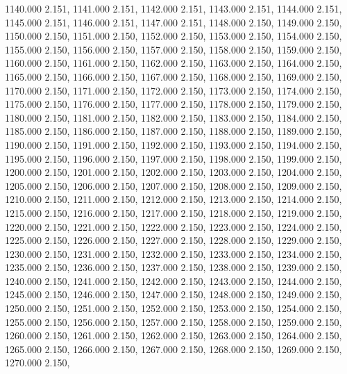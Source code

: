 1140.000 2.151, 
1141.000 2.151, 
1142.000 2.151, 
1143.000 2.151, 
1144.000 2.151, 
1145.000 2.151, 
1146.000 2.151, 
1147.000 2.151, 
1148.000 2.150, 
1149.000 2.150, 
1150.000 2.150, 
1151.000 2.150, 
1152.000 2.150, 
1153.000 2.150, 
1154.000 2.150, 
1155.000 2.150, 
1156.000 2.150, 
1157.000 2.150, 
1158.000 2.150, 
1159.000 2.150, 
1160.000 2.150, 
1161.000 2.150, 
1162.000 2.150, 
1163.000 2.150, 
1164.000 2.150, 
1165.000 2.150, 
1166.000 2.150, 
1167.000 2.150, 
1168.000 2.150, 
1169.000 2.150, 
1170.000 2.150, 
1171.000 2.150, 
1172.000 2.150, 
1173.000 2.150, 
1174.000 2.150, 
1175.000 2.150, 
1176.000 2.150, 
1177.000 2.150, 
1178.000 2.150, 
1179.000 2.150, 
1180.000 2.150, 
1181.000 2.150, 
1182.000 2.150, 
1183.000 2.150, 
1184.000 2.150, 
1185.000 2.150, 
1186.000 2.150, 
1187.000 2.150, 
1188.000 2.150, 
1189.000 2.150, 
1190.000 2.150, 
1191.000 2.150, 
1192.000 2.150, 
1193.000 2.150, 
1194.000 2.150, 
1195.000 2.150, 
1196.000 2.150, 
1197.000 2.150, 
1198.000 2.150, 
1199.000 2.150, 
1200.000 2.150, 
1201.000 2.150, 
1202.000 2.150, 
1203.000 2.150, 
1204.000 2.150, 
1205.000 2.150, 
1206.000 2.150, 
1207.000 2.150, 
1208.000 2.150, 
1209.000 2.150, 
1210.000 2.150, 
1211.000 2.150, 
1212.000 2.150, 
1213.000 2.150, 
1214.000 2.150, 
1215.000 2.150, 
1216.000 2.150, 
1217.000 2.150, 
1218.000 2.150, 
1219.000 2.150, 
1220.000 2.150, 
1221.000 2.150, 
1222.000 2.150, 
1223.000 2.150, 
1224.000 2.150, 
1225.000 2.150, 
1226.000 2.150, 
1227.000 2.150, 
1228.000 2.150, 
1229.000 2.150, 
1230.000 2.150, 
1231.000 2.150, 
1232.000 2.150, 
1233.000 2.150, 
1234.000 2.150, 
1235.000 2.150, 
1236.000 2.150, 
1237.000 2.150, 
1238.000 2.150, 
1239.000 2.150, 
1240.000 2.150, 
1241.000 2.150, 
1242.000 2.150, 
1243.000 2.150, 
1244.000 2.150, 
1245.000 2.150, 
1246.000 2.150, 
1247.000 2.150, 
1248.000 2.150, 
1249.000 2.150, 
1250.000 2.150, 
1251.000 2.150, 
1252.000 2.150, 
1253.000 2.150, 
1254.000 2.150, 
1255.000 2.150, 
1256.000 2.150, 
1257.000 2.150, 
1258.000 2.150, 
1259.000 2.150, 
1260.000 2.150, 
1261.000 2.150, 
1262.000 2.150, 
1263.000 2.150, 
1264.000 2.150, 
1265.000 2.150, 
1266.000 2.150, 
1267.000 2.150, 
1268.000 2.150, 
1269.000 2.150, 
1270.000 2.150, 
